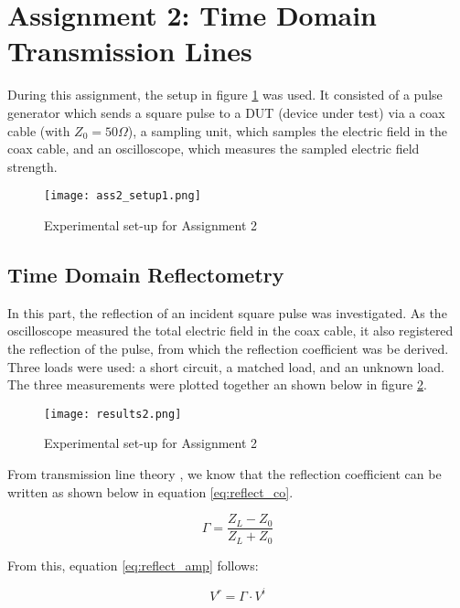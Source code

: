 \section*{Assignment 2: Time Domain Transmission Lines}

During this assignment, the setup in figure \ref{fig:ass2_setup1} was used. It consisted of a pulse generator which sends a square pulse to a DUT (device under test) via a coax cable (with $Z_0 = 50 \Omega$), a sampling unit, which samples the electric field in the coax cable, and an oscilloscope, which measures the sampled electric field strength.\\

\begin{figure}[H]
	\centering
	\texttt{[image: ass2\_setup1.png]}
	\caption{Experimental set-up for Assignment 2}
	\label{fig:ass2_setup1}
\end{figure}

\subsection*{Time Domain Reflectometry}

In this part, the reflection of an incident square pulse was investigated. As the oscilloscope measured the total electric field in the coax cable, it also registered the reflection of the pulse, from which the reflection coefficient was be derived. Three loads were used: a short circuit, a matched load, and an unknown load. The three measurements were plotted together an shown below in figure \ref{fig:results2}.

\begin{figure}[H]
	\centering
	\texttt{[image: results2.png]}
	\caption{Experimental set-up for Assignment 2}
	\label{fig:results2}
\end{figure}

From transmission line theory \cite{textbook}, we know that the reflection coefficient can be written as shown below in equation \ref{eq:reflect_co}.

\begin{equation}
\Gamma = \frac{Z_L - Z_0}{Z_L + Z_0}
\label{eq:reflect_co}
\end{equation}

From this, equation \ref{eq:reflect_amp} follows:

\begin{equation}
V^r = \Gamma \cdot V^i
\label{eq:reflect_amp}
\end{equation}

